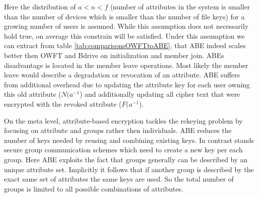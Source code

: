 Here the distribution of $a < n < f$ (number of attributes in the system is smaller than the number of devices which is smaller than the number of file keys) for a growing number of users is assumed. While this assumption does not necessarily hold true, on average this constrain will be satisfied. Under this assumption we can extract from table \ref{tab:comparisonsOWFTtoABE}, that \ac{ABE} indeed scales better then \ac{OWFT} and Bdrive on initialization and member join. ABEs disadvantage is located in the member leave operations. Most likely the member leave would describe a degradation or revocation of an attribute. \ac{ABE} suffers from additional overhead due to updating the attribute key for each user owning this old attribute ($N(a^{-1}$) and additionally updating all cipher text that were encrypted with the revoked attribute ($F(a^{-1}$).

On the meta level, attribute-based encryption tackles the rekeying problem by focusing on attribute and groups rather then individuals. \ac{ABE} reduces the number of keys needed by reusing and combining existing keys. In contrast stands secure group communication schemes which need to create a new key per each group. Here \ac{ABE} exploits the fact that groups generally can be described by an unique attribute set. Implicitly it follows that if another group is described by the exact same set of attributes the same keys are used. So the total number of groups is limited to all possible combinations of attributes. 



